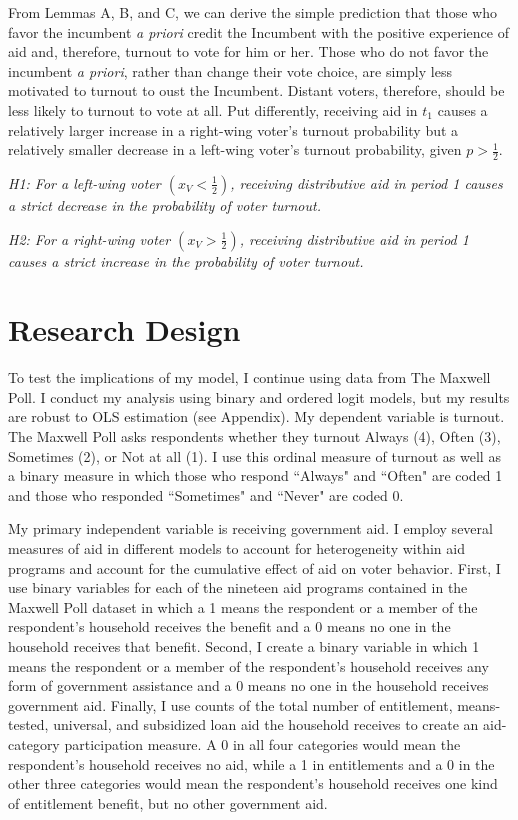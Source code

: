 \documentclass[12pt]{paper}
\begin{document}
From Lemmas A, B, and C, we can derive the simple prediction that those who favor the incumbent \emph{a priori} credit the Incumbent with the positive experience of aid and, therefore, turnout to vote for him or her. Those who do not favor the incumbent \emph{a priori}, rather than change their vote choice, are simply less motivated to turnout to oust the Incumbent. Distant voters, therefore, should be less likely to turnout to vote at all. Put differently, receiving aid in $t_1$ causes a relatively larger increase in a right-wing voter’s turnout probability but a relatively smaller decrease in a left-wing voter’s turnout probability, given $p > \frac{1}{2}$. 

\emph{H1: For a left-wing voter $(x_V < \frac{1}{2})$, receiving distributive aid in period 1 causes a strict decrease in the probability of voter turnout.}

\emph{H2: For a right-wing voter $(x_V > \frac{1}{2})$, receiving distributive aid in period 1 causes a strict increase in the probability of voter turnout.}

\section{Research Design}
To test the implications of my model, I continue using data from The Maxwell Poll. I conduct my analysis using binary and ordered logit models, but my results are robust to OLS estimation (see Appendix). My dependent variable is turnout. The Maxwell Poll asks respondents whether they turnout Always (4), Often (3), Sometimes (2), or Not at all (1). I use this ordinal measure of turnout as well as a binary measure in which those who respond ``Always" and ``Often" are coded 1 and those who responded ``Sometimes" and ``Never" are coded 0.

My primary independent variable is receiving government aid. I employ several measures of aid in different models to account for heterogeneity within aid programs and account for the cumulative effect of aid on voter behavior. First, I use binary variables for each of the nineteen aid programs contained in the Maxwell Poll dataset in which a 1 means the respondent or a member of the respondent’s household receives the benefit and a 0 means no one in the household receives that benefit. Second, I create a binary variable in which 1 means the respondent or a member of the respondent’s household receives any form of government assistance and a 0 means no one in the household receives government aid. Finally, I use counts of the total number of entitlement, means-tested, universal, and subsidized loan aid the household receives to create an aid-category participation measure. A 0 in all four categories would mean the respondent’s household receives no aid, while a 1 in entitlements and a 0 in the other three categories would mean the respondent’s household receives one kind of entitlement benefit, but no other government aid.
\end{document}
